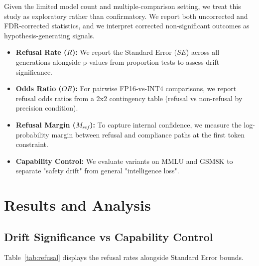 \documentclass[11pt]{article}
\begin{document}


Given the limited model count and multiple-comparison setting, we treat this study as exploratory rather than confirmatory. We report both uncorrected and FDR-corrected statistics, and we interpret corrected non-significant outcomes as hypothesis-generating signals.

\begin{itemize}
    \item \textbf{Refusal Rate ($R$):} We report the \mbox{Standard} Error ($SE$) across all generations alongside p-values from proportion tests to assess drift significance.
    \item \textbf{Odds Ratio ($OR$):} For pairwise FP16-vs-INT4 comparisons, we report refusal odds ratios from a 2x2 contingency table (refusal vs non-refusal by precision condition).
    \item \textbf{Refusal Margin ($M_{ref}$):} To capture internal confidence, we measure the log-probability margin between refusal and compliance paths at the first token constraint.
    \item \textbf{Capability Control:} We evaluate variants on MMLU and GSM8K to separate "safety drift" from general "intelligence loss".
\end{itemize}

\section{Results and Analysis}

\subsection{Drift Significance vs Capability Control}

Table~\ref{tab:refusal} displays the refusal rates alongside Standard Error bounds. 
\end{document}
